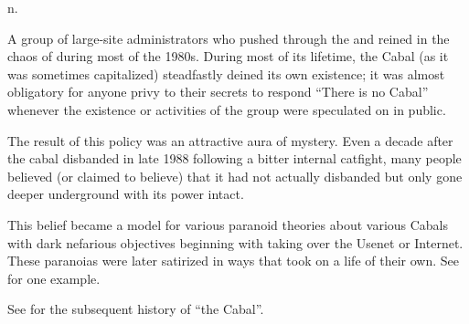  n.

A group of large-site administrators who pushed through the  and reined in the chaos of  during most of the
1980s. During most of its lifetime, the Cabal (as it was sometimes capitalized)
steadfastly deined its own existence; it was almost obligatory for anyone privy
to their secrets to respond ``There is no Cabal'' whenever the existence or
activities of the group were speculated on in public.

The result of this policy was an attractive aura of mystery. Even a decade after
the cabal  disbanded in late 1988 following a bitter
internal catfight, many people believed (or claimed to believe) that it had not
actually disbanded but only gone deeper underground with its power intact.

This belief became a model for various paranoid theories about various Cabals
with dark nefarious objectives beginning with taking over the Usenet or
Internet. These paranoias were later satirized in ways that took on a life of
their own. See  for one example.

See  for the subsequent history of ``the Cabal''.


